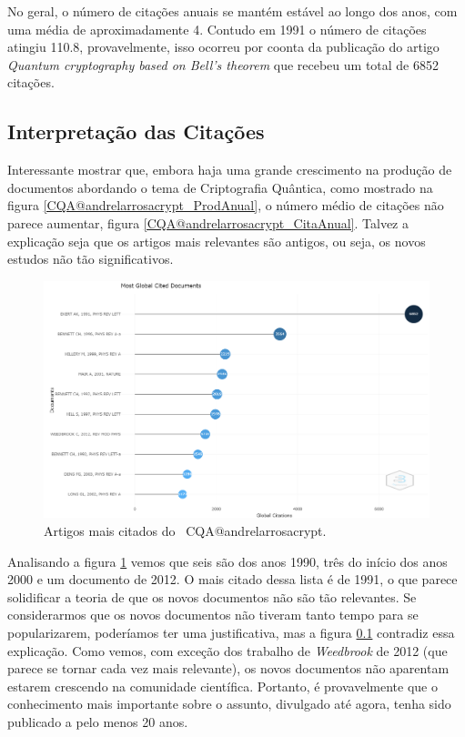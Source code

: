 No geral, o número de citações anuais se mantém estável ao longo dos anos, com uma média de aproximadamente 4. Contudo em 1991 o número de citações atingiu 110.8, provavelmente, isso ocorreu por coonta da publicação do artigo \textit{Quantum cryptography based on Bell’s theorem} que recebeu um total de 6852 citações.

\subsection{Interpretação das Citações}

Interessante mostrar que, embora haja uma grande crescimento na produção de documentos abordando o tema de Criptografia Quântica, como mostrado na figura \ref{CQA@andrelarrosacrypt_ProdAnual}, o número médio de citações não parece aumentar, figura \ref{CQA@andrelarrosacrypt_CitaAnual}. Talvez a explicação seja que os artigos mais relevantes são antigos, ou seja, os novos estudos não tão significativos.

\begin{figure}
    \centering
    \includegraphics[width=1\textwidth]{experiments/andrelarrosacrypt/AnaliseBibliometrica/CriptografiaQuantica/imagens/CQA@andrelarrosacrypt_MostCit.png}
    \caption{Artigos mais citados do \dataset\ CQA@andrelarrosacrypt.}
    \label{CQA@andrelarrosacrypt_MostCit}
\end{figure}

Analisando a figura \ref{CQA@andrelarrosacrypt_MostCit} vemos que seis são dos anos 1990, três do início dos anos 2000 e um documento de 2012. O mais citado dessa lista é de 1991, o que parece solidificar a teoria de que os novos documentos não são tão relevantes. Se considerarmos que os novos documentos não tiveram tanto tempo para se popularizarem, poderíamos ter uma justificativa, mas a figura \ref{} contradiz essa explicação. Como vemos, com exceção dos trabalho de \textit{Weedbrook} de 2012 (que parece se tornar cada vez mais relevante), os novos documentos não aparentam estarem crescendo na comunidade científica. Portanto, é provavelmente que o conhecimento mais importante sobre o assunto, divulgado até agora, tenha sido publicado a pelo menos 20 anos.

